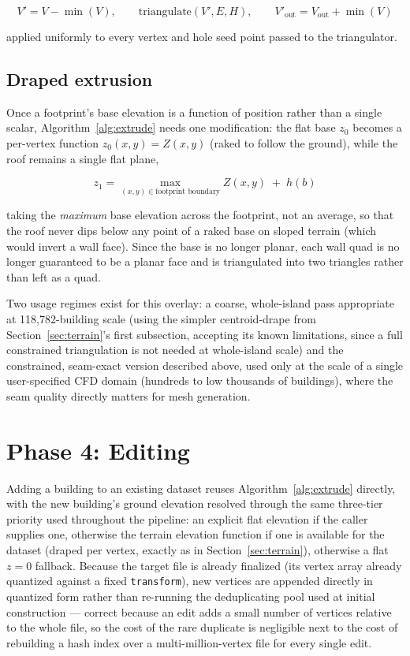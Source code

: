 \documentclass[11pt]{article}
\newcommand{\code}[1]{\texttt{#1}}
\begin{document}
\begin{equation}
  V' = V - \min(V), \qquad \text{triangulate}(V', E, H), \qquad V'_{\text{out}} = V_{\text{out}} + \min(V)
\end{equation}

applied uniformly to every vertex and hole seed point passed to the triangulator.

\subsection{Draped extrusion}

Once a footprint's base elevation is a function of position rather than a single scalar,
Algorithm~\ref{alg:extrude} needs one modification: the flat base $z_0$ becomes a per-vertex
function $z_0(x,y) = Z(x,y)$ (raked to follow the ground), while the roof remains a single
flat plane,

\begin{equation}
  z_1 = \max_{(x,y) \in \text{footprint boundary}} Z(x,y) \; + \; h(b)
\end{equation}

taking the \emph{maximum} base elevation across the footprint, not an average, so that the
roof never dips below any point of a raked base on sloped terrain (which would invert a wall
face). Since the base is no longer planar, each wall quad is no longer guaranteed to be a
planar face and is triangulated into two triangles rather than left as a quad.

Two usage regimes exist for this overlay: a coarse, whole-island pass appropriate at
118{,}782-building scale (using the simpler centroid-drape from
Section~\ref{sec:terrain}'s first subsection, accepting its known limitations, since a full
constrained triangulation is not needed at whole-island scale) and the constrained,
seam-exact version described above, used only at the scale of a single user-specified CFD
domain (hundreds to low thousands of buildings), where the seam quality directly matters for
mesh generation.

\section{Phase 4: Editing}
\label{sec:editing}

Adding a building to an existing dataset reuses Algorithm~\ref{alg:extrude} directly, with the
new building's ground elevation resolved through the same three-tier priority used throughout
the pipeline: an explicit flat elevation if the caller supplies one, otherwise the terrain
elevation function if one is available for the dataset (draped per vertex, exactly as in
Section~\ref{sec:terrain}), otherwise a flat $z=0$ fallback. Because the target file is already
finalized (its vertex array already quantized against a fixed \code{transform}), new vertices
are appended directly in quantized form rather than re-running the deduplicating pool used at
initial construction --- correct because an edit adds a small number of vertices relative to
the whole file, so the cost of the rare duplicate is negligible next to the cost of rebuilding
a hash index over a multi-million-vertex file for every single edit.
\end{document}
